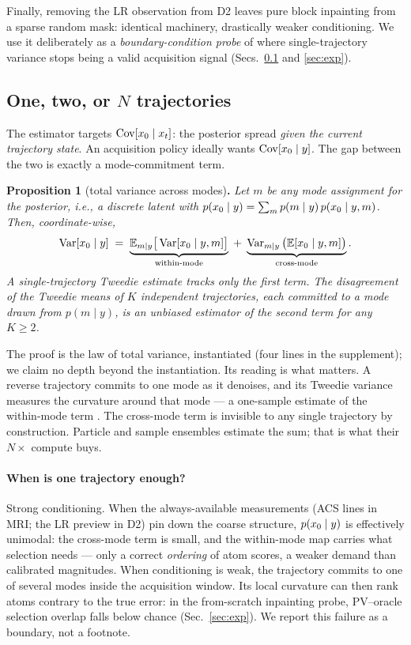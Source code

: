 Finally, removing the LR observation from D2 leaves pure block inpainting
from a sparse random mask: identical machinery, drastically weaker
conditioning. We use it deliberately as a \emph{boundary-condition probe}
of where single-trajectory variance stops being a valid acquisition
signal (Secs.~\ref{sec:method_when} and \ref{sec:exp}).

\subsection{One, two, or $N$ trajectories}\label{sec:method_when}

The estimator targets $\operatorname{Cov}[x_0 \mid x_t]$: the posterior
spread \emph{given the current trajectory state}. An acquisition policy
ideally wants $\operatorname{Cov}[x_0 \mid y]$. The gap between the two
is exactly a mode-commitment term.

\smallskip\noindent\textbf{Proposition 1} (total variance across
modes)\textbf{.} \emph{Let $m$ be any mode assignment for the posterior,
i.e., a discrete latent with
$p(x_0 \mid y) = \sum_m p(m \mid y)\, p(x_0 \mid y, m)$. Then,
coordinate-wise,}
\begin{equation}
  \operatorname{Var}[x_0 \mid y]
  \;=\; \underbrace{\mathbb{E}_{m \mid y}\big[\operatorname{Var}[x_0 \mid y, m]\big]}_{\text{within-mode}}
  \;+\; \underbrace{\operatorname{Var}_{m \mid y}\big(\mathbb{E}[x_0 \mid y, m]\big)}_{\text{cross-mode}} .
  \label{eq:ltv}
\end{equation}
\emph{A single-trajectory Tweedie estimate tracks only the first term.
The disagreement of the Tweedie means of $K$ independent trajectories,
each committed to a mode drawn from $p(m \mid y)$, is an unbiased
estimator of the second term for any $K \ge 2$.}

The proof is the law of total variance, instantiated (four lines in the
supplement); we claim no depth beyond the instantiation. Its reading is
what matters. A reverse trajectory commits to one mode as it denoises,
and its Tweedie variance measures the curvature around that mode --- a
one-sample estimate of the within-mode term \cite{manor2024posterior}.
The cross-mode term is invisible to any single trajectory by
construction. Particle and sample ensembles
\cite{nolan2025ads,elata2024adasense} estimate the sum; that is what
their $N\times$ compute buys.

\paragraph{When is one trajectory enough?}
Strong conditioning. When the always-available measurements (ACS lines
in MRI; the LR preview in D2) pin down the coarse structure,
$p(x_0 \mid y)$ is effectively unimodal: the cross-mode term is small,
and the within-mode map carries what selection needs --- only a correct
\emph{ordering} of atom scores, a weaker demand than calibrated
magnitudes. When conditioning is weak, the trajectory commits to one of
several modes inside the acquisition window. Its local curvature can
then rank atoms contrary to the true error: in the from-scratch
inpainting probe, PV--oracle selection overlap falls below chance
(Sec.~\ref{sec:exp}). We report this failure as a boundary, not a
footnote.

